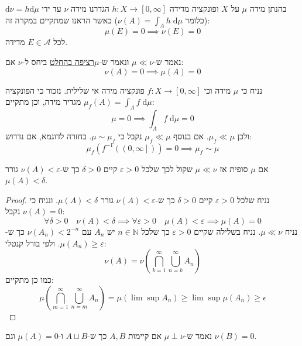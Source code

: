 \documentclass{tstextbook}
\begin{document}
\begin{reminder}
בהנתן מידה \(\mu\) על \(X\) ופונקציה מדידה \(h:X\to\left[ 0,\infty \right]\) הגדרנו מידה \(\nu\) עד ידי \(\mathrm{d}\nu=h\mathrm{d}\mu\) (כלומר \(\nu(A)=\int _{A}h \;\mathrm{d} \mu\)) כאשר הראנו שמתקיים במקרה זה:
$$\mu(E)=0\implies \nu(E)=0$$
לכל \(E \in \mathcal{A}\) מדידה.

\end{reminder}
\begin{definition}
נאמר ש-\(\mu\ll \nu\)  ונאמר ש-\(\mu\)\underline{רציפה בהחלט} ביחס ל-\(\nu\) אם:
$$\nu(A)=0\implies \mu(A)=0$$

\end{definition}
\begin{example}
נניח כי \(\mu\) מידה וכי \(f:X\to \left[ 0,\infty \right]\) פונקציה מידה אי שלילית. נזכור כי הפונקציה \(\mu_{f}(A)=\int _{A}f \;\mathrm{d} \mu\) מגדיר מידה,
וכן מתקיים:
$$\mu=0\implies\int _{A}f \;\mathrm{d} \mu=0  $$
ולכן \(\mu_{f}\ll \mu\). אם בנוסף \(\mu_{f}\ll \mu\) נקבל כי \(\mu \sim \mu_{f}\). בחזרה לדוגמא, אם נדרוש:
$$\mu_{f}\left( f^{-1}\left( \left( 0,\infty \right] \right) \right)=0\implies \mu_{f}\sim \mu$$

\end{example}
\begin{proposition}
אם \(\mu\) סופית אז \(\mu\ll \nu\) שקול לכך שלכל \(\varepsilon>0\) קיים \(\delta> 0\) כך ש-\(\nu(A)<\varepsilon\) גורר \(\mu(A)<\delta\).

\end{proposition}
\begin{proof}
נניח שלכל \(\varepsilon>0\) קיים \(\delta> 0\) כך ש-\(\nu(A)<\varepsilon\) גורר \(\mu(A)<\delta\). ונניח כי \(\nu(A)=0\) נקבל:
$$\forall \delta>0\quad \nu(A)<\delta\implies \forall\varepsilon>0\quad  \mu(A)<\varepsilon\implies \mu(A)=0$$
נניח \(\mu\ll \nu\). נניח בשלילה שקיים \(\varepsilon>0\) כך שלכל \(n \in \mathbb{N}\) יש \(A_{n}\) עם \(\nu(A_{n})<2^{-n}\) כך ש-\(\mu(A_{n})\geq \varepsilon\). ולפי בורל קנטלי:
$$\nu(A)=\nu\left( \bigcap_{k=1}^{\infty}\bigcup_{n=k}^{\infty} A_{n} \right)$$
כמו כן מתקיים:
$$\mu\left( \bigcap_{m=1}^{\infty}\bigcup_{n=m}^{\infty}A_{n} \right)=\mu\left( \operatorname*{lim}\operatorname*{sup}A_{n} \right)\geq\operatorname*{lim}\operatorname*{sup}\mu(A_{n})\geq\epsilon $$

\end{proof}
\begin{definition}
נאמר ש-\(\mu \perp \nu\) אם קיימות \(A,B\) כך ש-\(A\sqcup B\) ו-\(\mu(A)=0\) וגם \(\nu(B)=0\).

\end{definition}
\end{document}
